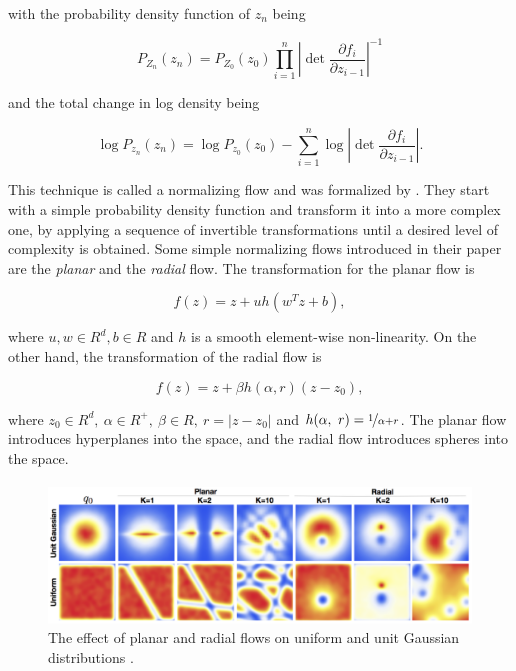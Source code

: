 with the probability density function of $ z_n $ being

\begin{equation}
    \label{equation:cnf:nf:total_change_density}
    P_{Z_n}(z_n) = P_{Z_0}(z_0) \prod_{i=1}^n \left | \det \frac{\partial f_i}{\partial z_{i-1}} \right |^{-1}
\end{equation}

and the total change in log density being

\begin{equation}
    \label{equation:cnf:nf:total_change_log_density}
    \log P_{z_n}(z_n) = \log P_{z_0}(z_0) - \sum_{i=1}^n \log \left | \det \frac{\partial f_i}{\partial z_{i-1}} \right |.
\end{equation}

This technique is called a normalizing flow and was formalized by \citet{rezende2015variational}. They start with a simple probability density function and transform it into a more complex one, by applying a sequence of invertible transformations until a desired level of complexity is obtained. Some simple normalizing flows introduced in their paper \citep{rezende2015variational} are the \emph{planar} and the \emph{radial} flow. The transformation for the planar flow is

\begin{displaymath}
    f(z) = z + uh(w^Tz + b),
\end{displaymath}

where $ u, w \in R^d, b \in R $ and $ h $ is a smooth element-wise non-linearity. On the other hand, the transformation of the radial flow is

\begin{displaymath}
    f(z) = z + \beta h(\alpha, r)(z - z_0),
\end{displaymath}

where $ z_0 \in R^d, \ \alpha \in R^+, \ \beta \in R, \ r = \lvert z - z_0 \rvert $ and $ h(\alpha, \ r) = \nicefrac{1}{\alpha + r} $. The planar flow introduces hyperplanes into the space, and the radial flow introduces spheres into the space.

\begin{figure}[ht]
      \centering
      \includegraphics[width=\columnwidth]{figures/planar_radial_flows.png}
      \caption{The effect of planar and radial flows on uniform and unit Gaussian distributions \citep{rezende2015variational}.}
      \label{figure:cnf:planar_radial_flows}
\end{figure}

